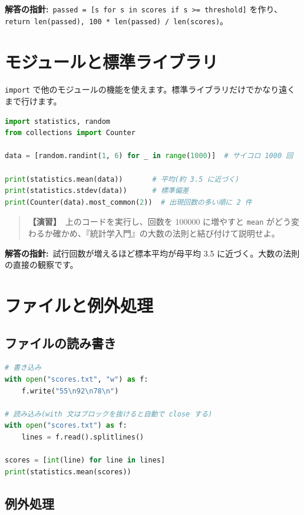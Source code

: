 \documentclass{article}
\begin{document}
\textbf{解答の指針:}\ \texttt{passed = [s for s in scores if s >= threshold]} を作り、\texttt{return len(passed), 100 * len(passed) / len(scores)}。

\section{モジュールと標準ライブラリ}

\texttt{import} で他のモジュールの機能を使えます。標準ライブラリだけでかなり遠くまで行けます。

\begin{lstlisting}[language=Python]
import statistics, random
from collections import Counter

data = [random.randint(1, 6) for _ in range(1000)]  # サイコロ 1000 回

print(statistics.mean(data))       # 平均(約 3.5 に近づく)
print(statistics.stdev(data))      # 標準偏差
print(Counter(data).most_common(2))  # 出現回数の多い順に 2 件
\end{lstlisting}

\begin{quote}
\textbf{【演習】}\ 上のコードを実行し、回数を 100000 に増やすと \texttt{mean} がどう変わるか確かめ、『統計学入門』の大数の法則と結び付けて説明せよ。
\end{quote}

\textbf{解答の指針:}\ 試行回数が増えるほど標本平均が母平均 3.5 に近づく。大数の法則の直接の観察です。

\section{ファイルと例外処理}

\subsection{ファイルの読み書き}

\begin{lstlisting}[language=Python]
# 書き込み
with open("scores.txt", "w") as f:
    f.write("55\n92\n78\n")

# 読み込み(with 文はブロックを抜けると自動で close する)
with open("scores.txt") as f:
    lines = f.read().splitlines()

scores = [int(line) for line in lines]
print(statistics.mean(scores))
\end{lstlisting}

\subsection{例外処理}
\end{document}
